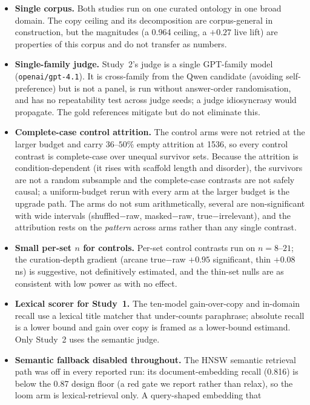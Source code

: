 \documentclass[10pt,twocolumn]{article}
\begin{document}
\begin{itemize}[topsep=2pt,itemsep=2pt,leftmargin=1.4em]
\item \textbf{Single corpus.} Both studies run on one curated ontology in one broad domain. The copy
ceiling and its decomposition are corpus-general in construction, but the magnitudes (a 0.964 ceiling,
a $+0.27$ live lift) are properties of this corpus and do not transfer as numbers.
\item \textbf{Single-family judge.} Study~2's judge is a single GPT-family model
(\texttt{openai/gpt-4.1}). It is cross-family from the Qwen candidate (avoiding self-preference) but is
not a panel, is run without answer-order randomisation, and has no repeatability test across judge
seeds; a judge idiosyncrasy would propagate. The gold references mitigate but do not eliminate this.
\item \textbf{Complete-case control attrition.} The control arms were not retried at the larger budget
and carry $36$--$50\%$ empty attrition at 1536, so every control contrast is complete-case over unequal
survivor sets. Because the attrition is condition-dependent (it rises with scaffold length and
disorder), the survivors are not a random subsample and the complete-case contrasts are not safely
causal; a uniform-budget rerun with every arm at the larger budget is the upgrade path. The arms do not
sum arithmetically, several are non-significant with wide intervals (shuffled$-$raw, masked$-$raw,
true$-$irrelevant), and the attribution rests on the \emph{pattern} across arms rather than any single
contrast.
\item \textbf{Small per-set $n$ for controls.} Per-set control contrasts run on $n=8$--$21$; the
curation-depth gradient (arcane true$-$raw $+0.95$ significant, thin $+0.08$ ns) is suggestive, not
definitively estimated, and the thin-set nulls are as consistent with low power as with no effect.
\item \textbf{Lexical scorer for Study~1.} The ten-model gain-over-copy and in-domain recall use a
lexical title matcher that under-counts paraphrase; absolute recall is a lower bound and gain over copy
is framed as a lower-bound estimand. Only Study~2 uses the semantic judge.
\item \textbf{Semantic fallback disabled throughout.} The HNSW semantic retrieval path was off in every
reported run: its document-embedding recall (0.816) is below the 0.87 design floor (a red gate we
report rather than relax), so the loom arm is lexical-retrieval only. A query-shaped embedding that

\end{itemize}
\end{document}
